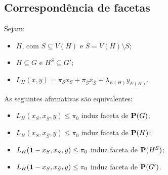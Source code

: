 \documentclass[
12pt,notheorems,hyperref={pdfauthor=whatever}
]{beamer}
\begin{document}
\subsection{Correspondência de facetas}
\begin{frame}
    
    
    Sejam:
    \begin{itemize}
        \item $H$, com $S\subseteq V(H)$ e $\bar S=V(H)\setminus S$;
        \item $H \subseteq G$ e $H^S \subseteq G'$;
        \item $L_H(x,y) = \pi_S x_S + \pi_{\bar S} x_{\bar S} + \lambda_{E(H)} y_{E(H)}$.
    \end{itemize}
    \pause

    \begin{theorem}\label{teo:valid-comutacao-parcial} As seguintes afirmativas são equivalentes:
        \begin{itemize}
            \item<3> $L_H(x_S, x_{\bar S},y) \leq \pi_0$ induz faceta de $\mathbf{P}(G)$; 
            \item<2-3> $L_H(x_S, x_{\bar S},y) \leq \pi_0$ induz faceta de $\mathbf{P}(H)$;
            \item<2-3> $L_H(\mathbf{1} - x_S, x_{\bar S},y) \leq \pi_0$ induz faceta de $\mathbf{P}(H^S)$;
            \item<3> $L_H(\mathbf{1} - x_S, x_{\bar S},y) \leq \pi_0$ induz faceta de $\mathbf{P}(G')$.
        \end{itemize}
    \end{theorem}
\end{frame}
\end{document}
